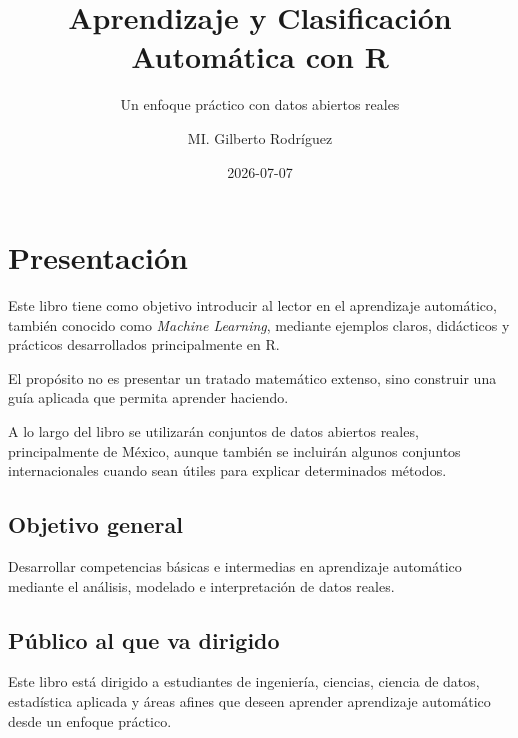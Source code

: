 \documentclass[
  11pt,
  letterpaper,
]{book}
\title{Aprendizaje y Clasificación Automática con R}
\subtitle{Un enfoque práctico con datos abiertos reales}
\author{MI. Gilberto Rodríguez}
\date{2026-07-07}
\renewcommand*\contentsname{Table of contents}
\newcommand\contentsname{Table of contents}
\begin{document}
\frontmatter
\maketitle

\renewcommand*\contentsname{Table of contents}
{
\setcounter{tocdepth}{2}
\tableofcontents
}

\mainmatter
{}

\chapter*{Presentación}\label{presentaciuxf3n}


Este libro tiene como objetivo introducir al lector en el aprendizaje
automático, también conocido como \emph{Machine Learning}, mediante
ejemplos claros, didácticos y prácticos desarrollados principalmente en
R.

El propósito no es presentar un tratado matemático extenso, sino
construir una guía aplicada que permita aprender haciendo.

A lo largo del libro se utilizarán conjuntos de datos abiertos reales,
principalmente de México, aunque también se incluirán algunos conjuntos
internacionales cuando sean útiles para explicar determinados métodos.

\section*{Objetivo general}\label{objetivo-general}


Desarrollar competencias básicas e intermedias en aprendizaje automático
mediante el análisis, modelado e interpretación de datos reales.

\section*{Público al que va
dirigido}\label{puxfablico-al-que-va-dirigido}


Este libro está dirigido a estudiantes de ingeniería, ciencias, ciencia
de datos, estadística aplicada y áreas afines que deseen aprender
aprendizaje automático desde un enfoque práctico.
\end{document}
